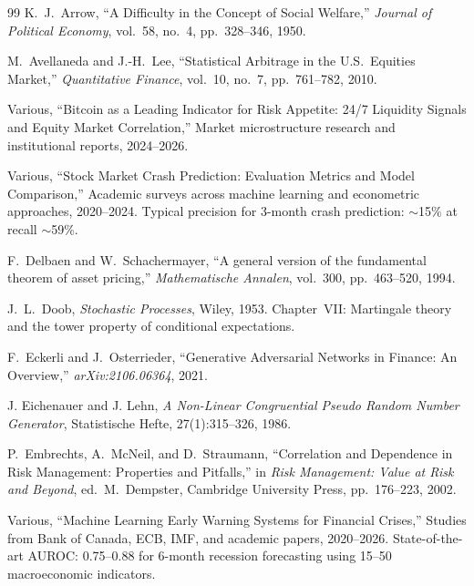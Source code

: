 \vspace{2em}
\begin{thebibliography}{99}
K.~J.~Arrow,
``A Difficulty in the Concept of Social Welfare,''
\emph{Journal of Political Economy}, vol.~58, no.~4, pp.~328--346, 1950.

M.~Avellaneda and J.-H.~Lee,
``Statistical Arbitrage in the U.S.\ Equities Market,''
\emph{Quantitative Finance}, vol.~10, no.~7, pp.~761--782, 2010.

Various,
``Bitcoin as a Leading Indicator for Risk Appetite: 24/7 Liquidity Signals and Equity Market Correlation,''
Market microstructure research and institutional reports, 2024--2026.

Various,
``Stock Market Crash Prediction: Evaluation Metrics and Model Comparison,''
Academic surveys across machine learning and econometric approaches, 2020--2024.
Typical precision for 3-month crash prediction: $\sim$15\% at recall $\sim$59\%.

F.~Delbaen and W.~Schachermayer,
``A general version of the fundamental theorem of asset pricing,''
\emph{Mathematische Annalen}, vol.~300, pp.~463--520, 1994.

J.~L.~Doob,
\emph{Stochastic Processes},
Wiley, 1953.
Chapter~VII: Martingale theory and the tower property of conditional expectations.

F.~Eckerli and J.~Osterrieder,
``Generative Adversarial Networks in Finance: An Overview,''
\emph{arXiv:2106.06364}, 2021.

J. Eichenauer and J. Lehn,
\textit{A Non-Linear Congruential Pseudo Random Number Generator},
Statistische Hefte, 27(1):315--326, 1986.

P.~Embrechts, A.~McNeil, and D.~Straumann,
``Correlation and Dependence in Risk Management: Properties and Pitfalls,''
in \emph{Risk Management: Value at Risk and Beyond}, ed.\ M.~Dempster,
Cambridge University Press, pp.~176--223, 2002.


Various,
``Machine Learning Early Warning Systems for Financial Crises,''
Studies from Bank of Canada, ECB, IMF, and academic papers, 2020--2026.
State-of-the-art AUROC: 0.75--0.88 for 6-month recession forecasting using 15--50 macroeconomic indicators.


\end{thebibliography}
